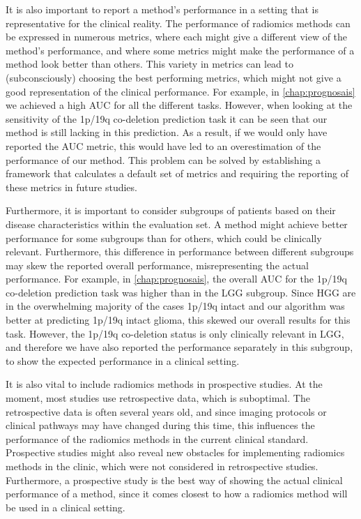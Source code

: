 It is also important to report a method's performance in a setting that is representative for the clinical reality.
The performance of radiomics methods can be expressed in numerous metrics, where each might give a different view of the method's performance, and where some metrics might make the performance of a method look better than others.
This variety in metrics can lead to (subconsciously) choosing the best performing metrics, which might not give a good representation of the clinical performance.
For example, in \cref{chap:prognosais} we achieved a high \gls{AUC} for all the different tasks.
However, when looking at the sensitivity of the 1p/19q co-deletion prediction task it can be seen that our method is still lacking in this prediction.
As a result, if we would only have reported the \gls{AUC} metric, this would have led to an overestimation of the performance of our method.
This problem can be solved by establishing a framework that calculates a default set of metrics and requiring the reporting of these metrics in future studies.


Furthermore, it is important to consider subgroups of patients based on their disease characteristics within the evaluation set.
A method might achieve better performance for some subgroups than for others, which could be clinically relevant.
Furthermore, this difference in performance between different subgroups may skew the reported overall performance, misrepresenting the actual performance.
For example, in \cref{chap:prognosais}, the overall \gls{AUC} for the 1p/19q co-deletion prediction task was higher than in the \gls{LGG} subgroup.
Since \gls{HGG} are in the overwhelming majority of the cases 1p/19q intact and our algorithm was better at predicting 1p/19q intact glioma, this skewed our overall results for this task.
However, the 1p/19q co-deletion status is only clinically relevant in \gls{LGG}, and therefore we have also reported the performance separately in this subgroup, to show the expected performance in a clinical setting.


It is also vital to include radiomics methods in prospective studies.
At the moment, most studies use retrospective data, which is suboptimal.
The retrospective data is often several years old, and since imaging protocols or clinical pathways may have changed during this time, this influences the performance of the radiomics methods in the current clinical standard.
Prospective studies might also reveal new obstacles for implementing radiomics methods in the clinic, which were not considered in retrospective studies.
Furthermore, a prospective study is the best way of showing the actual clinical performance of a method, since it comes closest to how a radiomics method will be used in a clinical setting.

